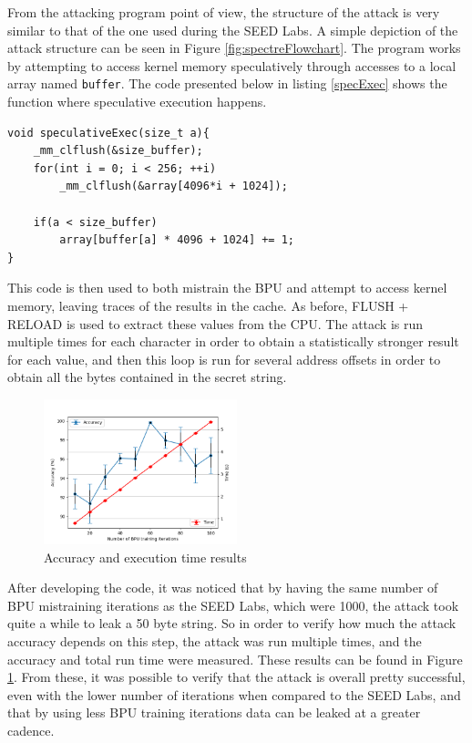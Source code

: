 \documentclass[conference]{IEEEtran}
\begin{document}
From the attacking program point of view, the structure of the attack is very similar to that of the one used during the SEED Labs. A simple depiction of the attack structure can be seen in Figure \ref{fig:spectreFlowchart}. The program works by attempting to access kernel memory speculatively through accesses to a local array named \texttt{buffer}. The code presented below in listing \ref{specExec} shows the function where speculative execution happens.

\begin{lstlisting}[style=CStyle, caption=speculativeExec() function, label=specExec]
void speculativeExec(size_t a){
    _mm_clflush(&size_buffer);
    for(int i = 0; i < 256; ++i)
        _mm_clflush(&array[4096*i + 1024]);

    if(a < size_buffer)
        array[buffer[a] * 4096 + 1024] += 1;
}
\end{lstlisting}

This code is then used to both mistrain the BPU and attempt to access kernel memory, leaving traces of the results in the cache. As before, FLUSH + RELOAD is used to extract these values from the CPU. The attack is run multiple times for each character in order to obtain a statistically stronger result for each value, and then this loop is run for several address offsets in order to obtain all the bytes contained in the secret string.

\begin{figure}[h]
    \centering
    \includegraphics[width=0.5\textwidth]{figures/resultsAccuracyTime.png}
    \caption{Accuracy and execution time results}
    \label{fig:accuracyResults}
\end{figure}

After developing the code, it was noticed that by having the same number of BPU mistraining iterations as the SEED Labs, which were 1000, the attack took quite a while to leak a 50 byte string. So in order to verify how much the attack accuracy depends on this step, the attack was run multiple times, and the accuracy and total run time were measured. These results can be found in Figure \ref{fig:accuracyResults}. From these, it was possible to verify that the attack is overall pretty successful, even with the lower number of iterations when compared to the SEED Labs, and that by using less BPU training iterations data can be leaked at a greater cadence.
\end{document}
